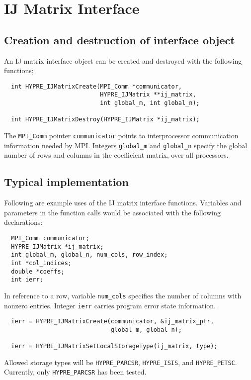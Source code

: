 \section{IJ Matrix Interface}

\subsection{Creation and destruction of interface object}

An IJ matrix interface object can be created and destroyed with
the following functions;
\begin{verbatim}
  int HYPRE_IJMatrixCreate(MPI_Comm *communicator,
                           HYPRE_IJMatrix **ij_matrix,
                           int global_m, int global_n);

  int HYPRE_IJMatrixDestroy(HYPRE_IJMatrix *ij_matrix);
\end{verbatim}
\noindent The \verb+MPI_Comm+ pointer \verb+communicator+
points to interprocessor communication information needed by MPI.
Integers \verb+global_m+ and \verb+global_n+ specify the global
number of rows and columns in the coefficient matrix, over all processors.

\subsection{Typical implementation}

Following are example uses of the IJ matrix interface functions.
Variables and parameters in the
function calls would be associated with the following declarations:

\begin{verbatim}
  MPI_Comm communicator;
  HYPRE_IJMatrix *ij_matrix;
  int global_m, global_n, num_cols, row_index;
  int *col_indices;
  double *coeffs;
  int ierr;
\end{verbatim}

\noindent In reference to a row, variable \verb+num_cols+ specifies
the number of columns with nonzero entries.
Integer \verb+ierr+ carries program error state information. 

\begin{verbatim}
  ierr = HYPRE_IJMatrixCreate(communicator, &ij_matrix_ptr,
                              global_m, global_n);

  ierr = HYPRE_IJMatrixSetLocalStorageType(ij_matrix, type);
\end{verbatim}

\noindent Allowed storage types will be \verb+HYPRE_PARCSR+,
\verb+HYPRE_ISIS+, and \verb+HYPRE_PETSC+.  Currently, only
\verb+HYPRE_PARCSR+ has been tested. 

